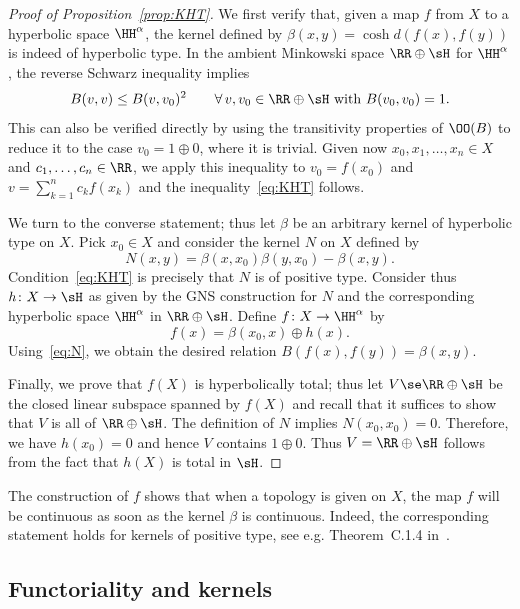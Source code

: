 \begin{proof}[Proof of Proposition~\ref{prop:KHT}]
We first verify that, given a map $f$ from $X$ to a hyperbolic space $\HH^\alpha$, the kernel defined by $\beta(x,y)=\cosh d(f(x),f(y))$ is indeed of hyperbolic type. In the ambient Minkowski space $\RR\oplus \sH$ for $\HH^\alpha$, the reverse Schwarz inequality implies
\[
B(v, v) \leq B(v, v_0)^2 \qquad \forall\, v, v_0\in \RR\oplus \sH \text{ with } B(v_0, v_0)=1.
\]
This can also be verified directly by using the transitivity properties of $\OO(B)$ to reduce it to the case $v_0=1\oplus 0$, where it is trivial. Given now $x_0, x_1, \ldots, x_n\in X$ and $c_1, \ldots, c_n\in \RR$, we apply this inequality to $v_0 = f(x_0)$ and $v=\sum_{k=1}^n c_k f(x_k)$ and the inequality~\eqref{eq:KHT} follows.

We turn to the converse statement; thus let $\beta$ be an arbitrary kernel of hyperbolic type on $X$. Pick $x_0\in X$ and consider the kernel $N$ on $X$ defined by
\begin{equation}\label{eq:N}
N(x,y) = \beta(x, x_0) \beta(y, x_0) - \beta(x, y).
\end{equation}
Condition~\eqref{eq:KHT} is precisely that $N$ is of positive type. Consider thus $h\colon X\to \sH$ as given by the GNS construction for $N$ and the corresponding hyperbolic space $\HH^\alpha$ in $\RR\oplus\sH$. Define $f\colon X\to \HH^\alpha$ by
\[
f(x) = \beta(x_0, x) \oplus h(x).
\]
Using~\eqref{eq:N}, we obtain the desired relation $B(f(x),f(y))=\beta(x,y)$.

Finally, we prove that $f(X)$ is hyperbolically total; thus let $V\se \RR\oplus\sH$ be the closed linear subspace spanned by $f(X)$ and recall that it suffices to show that $V$ is all of $\RR\oplus\sH$. The definition of $N$ implies $N(x_0, x_0)=0$. Therefore, we have $h(x_0)=0$ and hence $V$ contains $1\oplus 0$. Thus $V=\RR\oplus\sH$ follows from the fact that $h(X)$ is total in $\sH$.
\end{proof}

\begin{rema}\label{rem:GNS}
The construction of $f$ shows that when a topology is given on $X$, the map $f$ will be continuous as soon as the kernel $\beta$ is continuous. Indeed, the corresponding statement holds for kernels of positive type, see e.g. Theorem~C.1.4 in~\cite{Bekka-Harpe-Valette}.
\end{rema}

\subsection{Functoriality and kernels}

